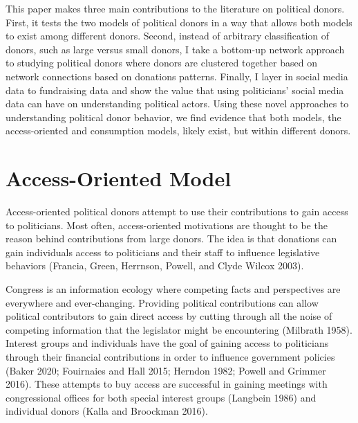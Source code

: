 \documentclass[12pt,]{article}
\begin{document}
This paper makes three main contributions to the literature on political
donors. First, it tests the two models of political donors in a way that
allows both models to exist among different donors. Second, instead of
arbitrary classification of donors, such as large versus small donors, I
take a bottom-up network approach to studying political donors where
donors are clustered together based on network connections based on
donations patterns. Finally, I layer in social media data to fundraising
data and show the value that using politicians' social media data can
have on understanding political actors. Using these novel approaches to
understanding political donor behavior, we find evidence that both
models, the access-oriented and consumption models, likely exist, but
within different donors.

\hypertarget{access-oriented-model}{%
\section{Access-Oriented Model}\label{access-oriented-model}}

Access-oriented political donors attempt to use their contributions to
gain access to politicians. Most often, access-oriented motivations are
thought to be the reason behind contributions from large donors. The
idea is that donations can gain individuals access to politicians and
their staff to influence legislative behaviors (Francia, Green,
Herrnson, Powell, and Clyde Wilcox 2003).

Congress is an information ecology where competing facts and
perspectives are everywhere and ever-changing. Providing political
contributions can allow political contributors to gain direct access by
cutting through all the noise of competing information that the
legislator might be encountering (Milbrath 1958). Interest groups and
individuals have the goal of gaining access to politicians through their
financial contributions in order to influence government policies (Baker
2020; Fouirnaies and Hall 2015; Herndon 1982; Powell and Grimmer 2016).
These attempts to buy access are successful in gaining meetings with
congressional offices for both special interest groups (Langbein 1986)
and individual donors (Kalla and Broockman 2016).
\end{document}
